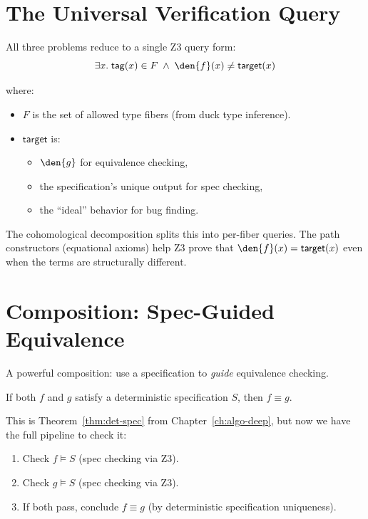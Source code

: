 \section{The Universal Verification Query}

All three problems reduce to a single Z3 query form:
\[
  \exists x.\; \mathsf{tag}(x) \in F \;\land\;
  \den{f}(x) \neq \mathsf{target}(x)
\]

where:
\begin{itemize}
  \item $F$ is the set of allowed type fibers (from duck type
    inference).
  \item $\mathsf{target}$ is:
    \begin{itemize}
      \item $\den{g}$ for equivalence checking,
      \item the specification's unique output for spec checking,
      \item the ``ideal'' behavior for bug finding.
    \end{itemize}
\end{itemize}

The cohomological decomposition splits this into per-fiber queries.
The path constructors (equational axioms) help Z3 prove that
$\den{f}(x) = \mathsf{target}(x)$ even when the terms are
structurally different.

\section{Composition: Spec-Guided Equivalence}

A powerful composition: use a specification to \emph{guide}
equivalence checking.

\begin{theorem}
If both $f$ and $g$ satisfy a deterministic specification $S$,
then $f \equiv g$.
\end{theorem}

This is Theorem~\ref{thm:det-spec} from Chapter~\ref{ch:algo-deep},
but now we have the full pipeline to check it:
\begin{enumerate}
  \item Check $f \models S$ (spec checking via Z3).
  \item Check $g \models S$ (spec checking via Z3).
  \item If both pass, conclude $f \equiv g$ (by deterministic
    specification uniqueness).
\end{enumerate}

